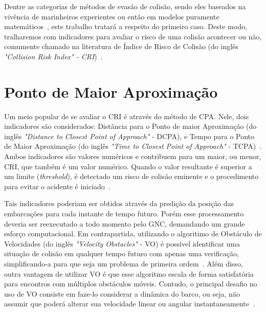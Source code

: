         Dentre as categorias de métodos de evasão de colisão, sendo eles baseados na vivência de marinheiros experientes ou então em modelos puramente matemáticos~\cite{HUANG2020451}, este trabalho tratará a respeito do primeiro caso. Deste modo, tralharemos com indicadores para avaliar o risco de uma colisão acontecer ou não, comumente chamado na literatura de Índice de Risco de Colisão (do inglês \textit{"Collision Risk Index" - CRI})~\cite{HUANG2019142}.
        
    \section{Ponto de Maior Aproximação}\label{subchap2:cpa}
        Um meio popular de se avaliar o CRI é através do método de CPA. Nele, dois indicadores são considerados: Distância para o Ponto de maior Aproximação (do inglês \textit{"Distance to Closest Point of Approach"} - DCPA), e Tempo para o Ponto de Maior Aproximação (do inglês \textit{"Time to Closest Point of Approach"} - TCPA)~\cite{HUANG2019142}. Ambos indicadores são valores numéricos e contribuem para um maior, ou menor, CRI, que também é um valor numérico. Quando o valor resultante é superior a um limite (\textit{threshold}), é detectado um risco de colisão eminente e o procedimento para evitar o acidente é iniciado~\cite{HUANG2020451}. 
        
        Tais indicadores poderiam ser obtidos através da predição da posição das embarcações para cada instante de tempo futuro. Porém esse processamento deveria ser reexecutado a todo momento pelo GNC, demandando um grande esforço computacional. Em contrapartida, utilizando o algoritimo de Obstáculo de Velocidades (do inglês \textit{"Velocity Obstacles"} - VO) é possível identificar uma situação de colisão em qualquer tempo futuro com apenas uma verificação, simplificando-a para que seja um problema de primeira ordem~\cite{KUWATA2014110}. Além disso, outra vantagem de utilizar VO é que esse algoritmo escala de forma satisfatória para encontros com múltiplos obstáculos móveis. Contudo, o principal desafio no uso de VO consiste em faze-lo considerar a dinâmica do barco, ou seja, não assumir que poderá alterar sua velocidade linear ou angular instantaneamente~\cite{HUANG2019142}.
        
